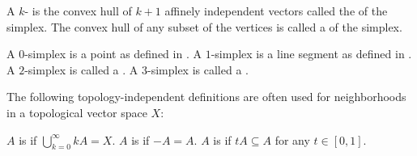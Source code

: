 \begin{definition}\label{def:simplex}
  A \( k \)- is the convex hull of \( k + 1 \) affinely independent vectors called the  of the simplex. The convex hull of any subset of the vertices is called a  of the simplex.

  \begin{defenum}
     A \( 0 \)-simplex is a point as defined in .
     A \( 1 \)-simplex is a line segment as defined in .
     A \( 2 \)-simplex is called a .
     A \( 3 \)-simplex is called a .
  \end{defenum}
\end{definition}

\begin{definition}\label{def:neighborhood_set_types}
  The following topology-independent definitions are often used for neighborhoods in a topological vector space \( X \):

  \begin{defenum}
     \( A \) is  if \( \bigcup_{k=0}^\infty kA = X \).
     \( A \) is  if \( -A = A \).
     \( A \) is  if \( tA \subseteq A \) for any \( t \in [0, 1] \).
  \end{defenum}
\end{definition}
